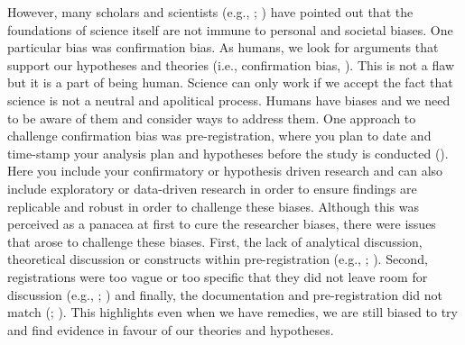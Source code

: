 \documentclass[
  letterpaper,
]{book}
\begin{document}
However, many scholars and scientists (e.g.,
;
) have pointed
out that the foundations of science itself are not immune to personal
and societal biases. One particular bias was confirmation bias. As
humans, we look for arguments that support our hypotheses and theories
(i.e., confirmation bias, ). This is not a flaw but it is a part of being human. Science can
only work if we accept the fact that science is not a neutral and
apolitical process. Humans have biases and we need to be aware of them
and consider ways to address them. One approach to challenge
confirmation bias was pre-registration, where you plan to date and
time-stamp your analysis plan and hypotheses before the study is
conducted ().
Here you include your confirmatory or hypothesis driven research and can
also include exploratory or data-driven research in order to ensure
findings are replicable and robust in order to challenge these biases.
Although this was perceived as a panacea at first to cure the researcher
biases, there were issues that arose to challenge these biases. First,
the lack of analytical discussion, theoretical discussion or constructs
within pre-registration (e.g.,
;
).
Second, registrations were too vague or too specific that they did not
leave room for discussion (e.g.,
;
) and finally,
the documentation and pre-registration did not match
(; ). This highlights even when we have remedies, we are still
biased to try and find evidence in favour of our theories and
hypotheses.
\end{document}

